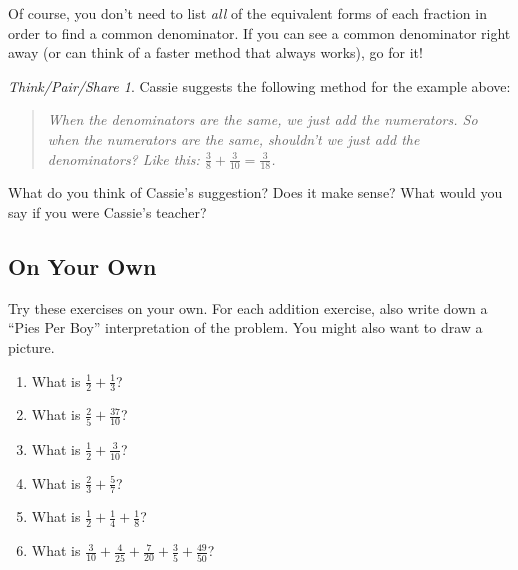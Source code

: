\documentclass[10pt, reqno]{amsart}
\theoremstyle{remark}
\newtheorem*{thinkpair*}{Think/Pair/Share}
\theoremstyle{definition}
\numberwithin{equation}{section}  %
\begin{document}
Of course, you don't need to list \emph{all} of the equivalent forms of each
fraction in order to find a common denominator. If you can see a common
denominator right away (or can think of a faster method that always works), go for it!

\begin{thinkpair*}
Cassie suggests the following method for the example above:

\begin{quotation}
\emph{When the denominators are the same, we just add the numerators.  So when the numerators are the same, shouldn't we just add the denominators?  Like this: $\frac 38 + \frac 3{10} = \frac 3{18}$.
}\end{quotation}

What do you think of Cassie's suggestion?  Does it make sense?  What would you say if you were Cassie's teacher?
\end{thinkpair*}



\subsection*{On Your Own}
Try these exercises on your own.  For each addition exercise, also write down a ``Pies Per Boy'' interpretation of the problem.  You might also want to draw a picture.

\begin{enumerate}
\item
What is $\frac 1 2 + \frac 1 3$?\\

\item
What is $\frac 2 5 + \frac {37}{10}$?\\

\item
What is $\frac 1 2 + \frac 3{10}$?\\

\item
What is $\frac 2 3 + \frac 5 7 $?\\

\item
What is $\frac 1 2 + \frac 1 4 + \frac 1 8$?\\

\item
What is $\frac 3{10} + \frac 4{25} + \frac 7{20} + \frac 35 + \frac{49}{50}$?\\
\end{enumerate}
\end{document}

